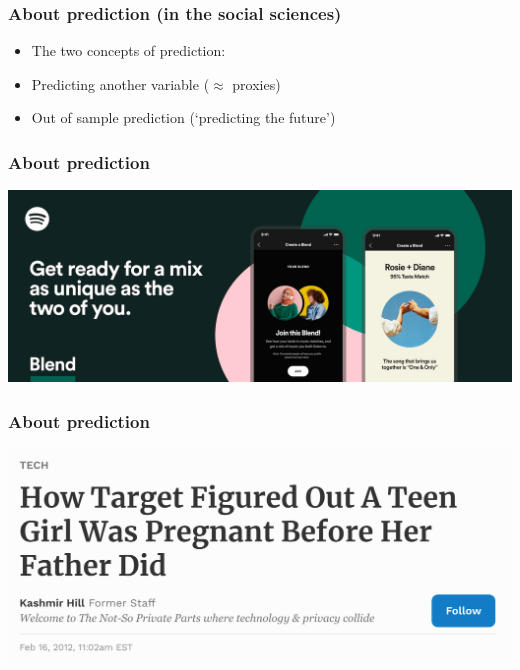 \documentclass[aspectratio=43]{beamer}
\begin{document}
\begin{frame}
\frametitle{About prediction (in the social sciences)}
\centering

\begin{itemize}
  \item[] The two concepts of prediction:
  \item Predicting another variable ($\approx$ proxies)
  \item Out of sample prediction (`predicting the future')
\end{itemize}

\end{frame}

\begin{frame}
\frametitle{About prediction}
\centering

\includegraphics[width = \textwidth]{../img/spotify}

\end{frame}

\begin{frame}
\frametitle{About prediction}
\centering

\includegraphics[width = \textwidth]{../img/target_pregnancy}

\end{frame}
\end{document}
